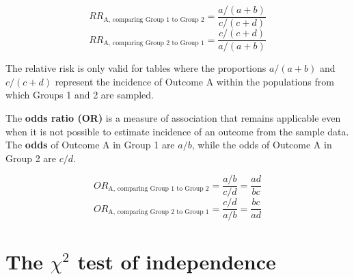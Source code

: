 \documentclass[letterpaper,12pt,twoside,]{pinp}
\begin{document}
\[RR_{\text{A, comparing Group 1 to Group 2}} = \dfrac{a/(a + b)}{c/(c+d)} \]
\[RR_{\text{A, comparing Group 2 to Group 1}} = \dfrac{c/(c + d)}{a/(a+b)} \]

The relative risk is only valid for tables where the proportions
\(a/(a + b)\) and \(c/(c + d)\) represent the incidence of Outcome A
within the populations from which Groups 1 and 2 are sampled.

The \textbf{odds ratio (OR)} is a measure of association that remains
applicable even when it is not possible to estimate incidence of an
outcome from the sample data. The \textbf{odds} of Outcome A in Group 1
are \(a/b\), while the odds of Outcome A in Group 2 are \(c/d\).

\[OR_{\text{A, comparing Group 1 to Group 2}} = \dfrac{a/b}{c/d} = \dfrac{ad}{bc} \]
\[OR_{\text{A, comparing Group 2 to Group 1}} = \dfrac{c/d}{a/b} = \dfrac{bc}{ad} \]

\vspace{0.5cm}

\hypertarget{the-chi2-test-of-independence}{%
\section{\texorpdfstring{The \(\chi^2\) test of
independence}{The \textbackslash chi\^{}2 test of independence}}\label{the-chi2-test-of-independence}}
\end{document}
